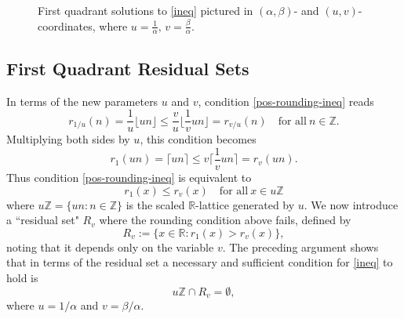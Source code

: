 \documentclass[12pt,letterpaper, reqno]{amsart}
\theoremstyle{definition}
\theoremstyle{remark}
\newcommand{\RR}{\ensuremath{\mathbb{R}}}
\newcommand{\ZZ}{\ensuremath{\mathbb{Z}}}
\newcommand{\R}{{R}}
\newcommand{\floor}[1]{\lfloor{#1}\rfloor}
\newcommand{\ceil}[1]{\lceil{#1}\rceil}
\begin{document}
\begin{figure}[h]
\begin{center}
\end{center}
\caption{First quadrant solutions to \eqref{ineq} pictured in $(\alpha,\beta)$- and $(u,v)$-coordinates,
where $u = \frac{1}{\alpha}, \, v= \frac{\beta}{\alpha}$.}\label{fig4}
\end{figure} 


%
%
\subsection{First Quadrant Residual Sets}\label{sec:41}

In terms of the new  parameters $u$ and $v $, 
condition \eqref{pos-rounding-ineq} reads
\[ r_{1/u}(n) = \frac1u\floor{u n}\leq \frac{v}{u}\floor{\frac{1}{v} un}=r_{v/u}(n)
\quad\text{for all}\ n\in \ZZ.
\]
Multiplying both sides by ${u}$, this condition becomes 
\[ r_1(un) = \ceil{un} \leq v\ceil{\frac{1}{v}un} = r_v(un).\]
Thus condition \eqref{pos-rounding-ineq} is equivalent to 
\begin{equation}\label{uv-rounding-pos}
r_1(x)  \leq  r_v(x) \quad\text{for all}\ x\in u\ZZ
\end{equation}
where $u\ZZ = \{un : n\in\ZZ\}$ is the scaled $\RR$-lattice generated by $u$.
We now introduce a ``residual set" $\R_v$ where the rounding condition above fails, defined by
\[ 
\R_v := \{ x\in \RR : r_1(x) > r_v(x)\},
\]
noting that it depends only on the variable $v$.
The  preceding argument shows that in terms of the residual set
 a necessary and sufficient condition for \eqref{ineq} to hold is
\begin{equation}\label{u-v-1} 
u\ZZ \cap \R_v = \emptyset,
\end{equation}
where $u = 1/\alpha$ and $v = \beta/\alpha$.
\end{document}
